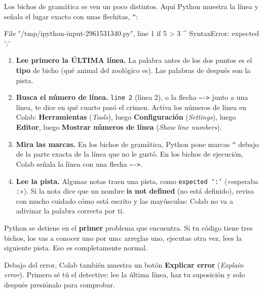 Los bichos de gramática se ven un poco distintos. Aquí Python muestra la línea y señala el lugar exacto con unas flechitas, \texttt{\textasciicircum}:

\begin{bzcolab}
  File "/tmp/ipython-input-2961531340.py", line 1
    if 5 > 3
            ^
SyntaxError: expected ':'
\end{bzcolab}

\begin{tcolorbox}[enhanced, colback=errbg, colframe=errframe, boxrule=0.8pt, arc=6pt,
  title={\textbf{La rutina del detective}}, coltitle=white, colbacktitle=errframe]
\begin{enumerate}[leftmargin=*]
  \item \textbf{Lee primero la ÚLTIMA línea.} La palabra antes de los dos puntos es el \textbf{tipo} de bicho (qué animal del zoológico es). Las palabras de después son la pista.
  \item \textbf{Busca el número de línea.} \texttt{line 2} (línea 2), o la flecha \texttt{---->} junto a una línea, te dice en qué cuarto pasó el crimen. Activa los números de línea en Colab: \textbf{Herramientas} (\textit{Tools}), luego \textbf{Configuración} (\textit{Settings}), luego \textbf{Editor}, luego \textbf{Mostrar números de línea} (\textit{Show line numbers}).
  \item \textbf{Mira las marcas.} En los bichos de gramática, Python pone marcas \texttt{\textasciicircum} debajo de la parte exacta de la línea que no le gustó. En los bichos de ejecución, Colab señala la línea con una flecha \texttt{---->}.
  \item \textbf{Lee la pista.} Algunas notas traen una pista, como \texttt{expected ':'} («esperaba \texttt{:}»). Si la nota dice que un nombre \textbf{is not defined} (no está definido), revisa con mucho cuidado cómo está escrito y las mayúsculas: Colab no va a adivinar la palabra correcta por ti.
\end{enumerate}
\end{tcolorbox}

\begin{watchout}
Python se detiene en el \textbf{primer} problema que encuentra. Si tu código tiene tres bichos, los vas a conocer uno por uno: arreglas uno, ejecutas otra vez, lees la siguiente pista. Eso es completamente normal.
\end{watchout}

Debajo del error, Colab también muestra un botón \textbf{Explicar error} (\textit{Explain error}). Primero sé tú el detective: lee la última línea, haz tu suposición y solo después presiónalo para comprobar.

